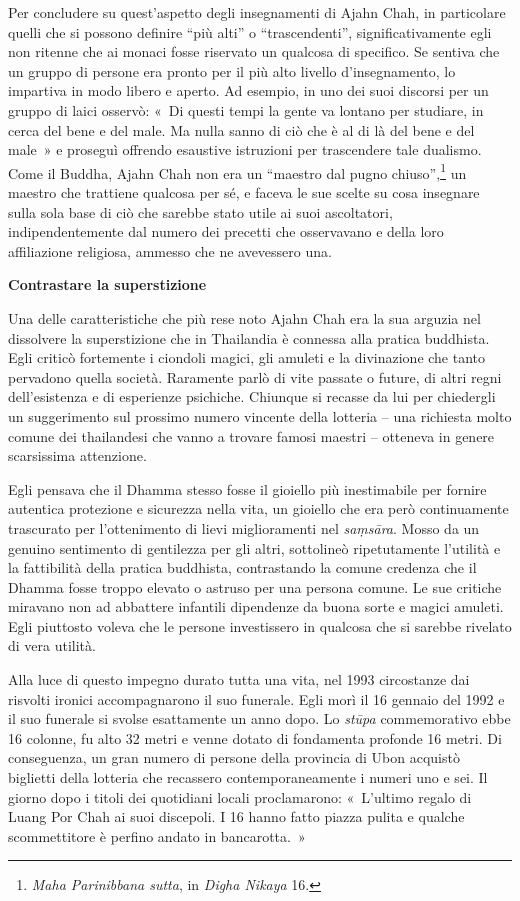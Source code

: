 Per concludere su quest'aspetto degli insegnamenti di Ajahn Chah, in
particolare quelli che si possono definire ``più alti'' o
``trascendenti'', significativamente egli non ritenne che ai monaci
fosse riservato un qualcosa di specifico. Se sentiva che un gruppo di
persone era pronto per il più alto livello d'insegnamento, lo impartiva
in modo libero e aperto. Ad esempio, in uno dei suoi discorsi per un
gruppo di laici osservò: «~Di questi tempi la gente va lontano per
studiare, in cerca del bene e del male. Ma nulla sanno di ciò che è al
di là del bene e del male~» e proseguì offrendo esaustive istruzioni per
trascendere tale dualismo. Come il Buddha, Ajahn Chah non era un
``maestro dal pugno chiuso'',\footnote{\emph{Maha Parinibbana sutta}, in
  \emph{Digha Nikaya} 16.} un maestro che trattiene qualcosa per sé, e
faceva le sue scelte su cosa insegnare sulla sola base di ciò che
sarebbe stato utile ai suoi ascoltatori, indipendentemente dal numero
dei precetti che osservavano e della loro affiliazione religiosa,
ammesso che ne avevessero una.

\textbf{Contrastare la superstizione}

Una delle caratteristiche che più rese noto Ajahn Chah era la sua
arguzia nel dissolvere la superstizione che in Thailandia è connessa
alla pratica buddhista. Egli criticò fortemente i ciondoli magici, gli
amuleti e la divinazione che tanto pervadono quella società. Raramente
parlò di vite passate o future, di altri regni dell'esistenza e di
esperienze psichiche. Chiunque si recasse da lui per chiedergli un
suggerimento sul prossimo numero vincente della lotteria -- una
richiesta molto comune dei thailandesi che vanno a trovare famosi
maestri -- otteneva in genere scarsissima attenzione.

Egli pensava che il Dhamma stesso fosse il gioiello più inestimabile per
fornire autentica protezione e sicurezza nella vita, un gioiello che era
però continuamente trascurato per l'ottenimento di lievi miglioramenti
nel \emph{saṃsāra}. Mosso da un genuino sentimento di gentilezza per gli
altri, sottolineò ripetutamente l'utilità e la fattibilità della pratica
buddhista, contrastando la comune credenza che il Dhamma fosse troppo
elevato o astruso per una persona comune. Le sue critiche miravano non
ad abbattere infantili dipendenze da buona sorte e magici amuleti. Egli
piuttosto voleva che le persone investissero in qualcosa che si sarebbe
rivelato di vera utilità.

Alla luce di questo impegno durato tutta una vita, nel 1993 circostanze
dai risvolti ironici accompagnarono il suo funerale. Egli morì il 16
gennaio del 1992 e il suo funerale si svolse esattamente un anno dopo.
Lo \emph{stūpa} commemorativo ebbe 16 colonne, fu alto 32 metri e venne
dotato di fondamenta profonde 16 metri. Di conseguenza, un gran numero
di persone della provincia di Ubon acquistò biglietti della lotteria che
recassero contemporaneamente i numeri uno e sei. Il giorno dopo i titoli
dei quotidiani locali proclamarono: «~L'ultimo regalo di Luang Por Chah
ai suoi discepoli. I 16 hanno fatto piazza pulita e qualche
scommettitore è perfino andato in bancarotta.~»

